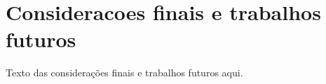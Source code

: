 \section{Consideracoes finais e trabalhos futuros}
\label{sec:consideracoes_finais_trabalhos_futuros}

Texto das considerações finais e trabalhos futuros aqui.
